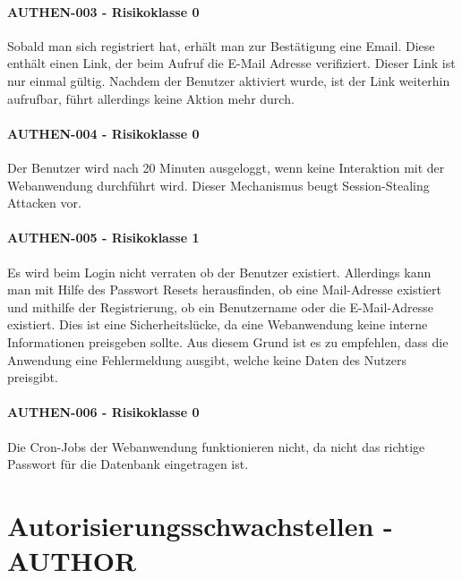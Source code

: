\paragraph{AUTHEN-003 - Risikoklasse 0}
Sobald man sich registriert hat, erhält man zur Bestätigung eine Email. Diese enthält einen Link, der beim Aufruf die E-Mail Adresse verifiziert. Dieser Link ist nur einmal gültig. Nachdem der Benutzer aktiviert wurde, ist der Link weiterhin aufrufbar, führt allerdings keine Aktion mehr durch.

\paragraph{AUTHEN-004 - Risikoklasse 0}
Der Benutzer wird nach 20 Minuten ausgeloggt, wenn keine Interaktion mit der Webanwendung durchführt wird. Dieser Mechanismus beugt Session-Stealing Attacken vor.

\clearpage
\paragraph{AUTHEN-005 - Risikoklasse 1}
Es wird beim Login nicht verraten ob der Benutzer existiert.
\linebreak
Allerdings kann man mit Hilfe des Passwort Resets herausfinden, ob eine Mail-Adresse existiert und mithilfe der Registrierung, ob ein Benutzername oder die E-Mail-Adresse existiert. Dies ist eine Sicherheitslücke, da eine Webanwendung keine interne Informationen preisgeben sollte. Aus diesem Grund ist es zu empfehlen, dass die Anwendung eine Fehlermeldung ausgibt, welche keine Daten des Nutzers preisgibt.

\paragraph{AUTHEN-006 - Risikoklasse 0}
Die Cron-Jobs der Webanwendung funktionieren nicht, da nicht das richtige Passwort für die Datenbank eingetragen ist.



\section{Autorisierungsschwachstellen - AUTHOR}

